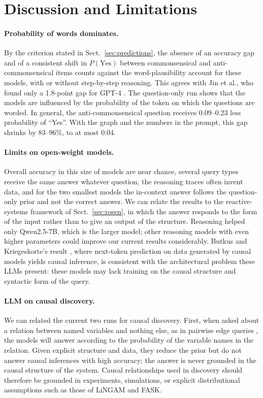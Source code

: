 \documentclass{llncs}
\begin{document}
\section{Discussion and Limitations}
\label{sec:discussion}

\paragraph{Probability of words dominates.} By the criterion stated in Sect.~\ref{sec:predictions}, the absence of an accuracy gap and of a consistent shift in $P(\text{Yes})$ between commonsensical and anti-commonsensical items counts against the word-plausibility account for these models, with or without step-by-step reasoning. This agrees with Jin et al., who found only a 1.8-point gap for GPT-4 \cite{jin2023cladder}. The question-only run shows that the models are influenced by the probability of the token on which the questions are worded. In general, the anti-commonsensical question receives 0.09--0.23 less probability of ``Yes''. With the graph and the numbers in the prompt, this gap shrinks by 83--96\%, to at most 0.04. 

\paragraph{Limits on open-weight models.} Overall accuracy in this size of models are near chance, several query types receive the same answer whatever question, the reasoning traces often invent data, and for the two smallest models the in-context answer follows the question-only prior and not the correct answer. We can relate the results to the reactive-systems framework of Sect.~\ref{sec:rosen}, in which the answer responds to the form of the input rather than to give an output of the structure. Reasoning helped only Qwen2.5-7B, which is the larger model; other reasoning models with even higher parameters could 
improve our current results considerably. Butkus and Kriegeskorte's result \cite{butkus2025causal}, where next-token prediction on data generated by causal models yields causal inference, is consistent with the architectural problem these LLMs present: these models may lack training on the causal structure and syntactic form of the query. 



\paragraph{LLM on causal discovery.} We can related the current two runs for causal discovery. First, when asked about a relation between named variables and nothing else, as in pairwise edge queries \cite{kiciman2023causal,long2023can}, the models will answer according to the probability of the variable names in the relation. Given explicit structure and data, they reduce the prior but do not answer causal inferences with high accuracy; the answer is never grounded in the causal structure of the system. Causal relationships used in discovery should therefore be grounded in experiments, simulations, or explicit distributional assumptions such as those of LiNGAM and FASK. 
\end{document}
